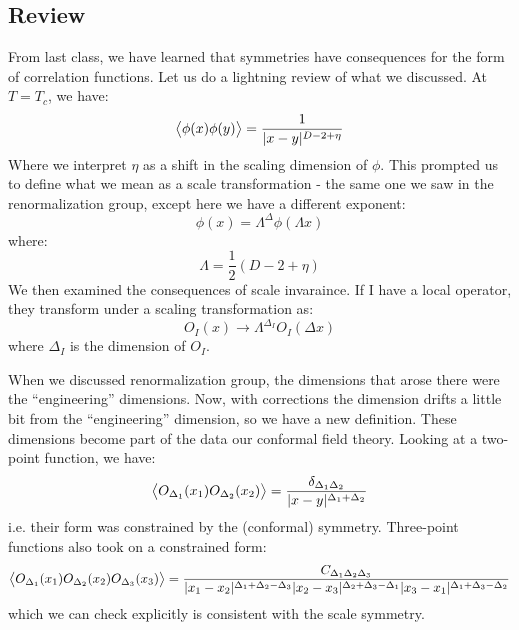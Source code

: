 \section{}
\subsection{Review}
From last class, we have learned that symmetries have consequences for the form of correlation functions. Let us do a lightning review of what we discussed. At $T = T_c$, we have:
\begin{equation}
    \avg{\phi(x)\phi(y)} = \frac{1}{\abs{x-y}^{D-2+\eta}}
\end{equation}
Where we interpret $\eta$ as a shift in the scaling dimension of $\phi$. This prompted us to define what we mean as a scale transformation - the same one we saw in the renormalization group, except here we have a different exponent:
\begin{equation}
    \phi(x) = \Lambda^\Delta\phi(\Lambda x)
\end{equation}
where:
\begin{equation}
    \Lambda = \frac{1}{2}(D - 2 + \eta)
\end{equation}
We then examined the consequences of scale invaraince. If I have a local operator, they transform under a scaling transformation as:
\begin{equation}
    O_I(x) \to \Lambda^{\Delta_I}O_I(\Delta x)
\end{equation}
where $\Delta_I$ is the dimension of $O_I$.

When we discussed renormalization group, the dimensions that arose there were the ``engineering'' dimensions. Now, with corrections the dimension drifts a little bit from the ``engineering'' dimension, so we have a new definition. These dimensions become part of the data our conformal field theory. Looking at a two-point function, we have:
\begin{equation}
    \left< O_{\Delta_1}(x_1)O_{\Delta_2}(x_2) \right> = \frac{\delta_{\Delta_1\Delta_2}}{\lvert x-y \rvert^{\Delta_1 + \Delta_2}}
\end{equation}
i.e. their form was constrained by the (conformal) symmetry. Three-point functions also took on a constrained form:
\begin{equation}
    \left< O_{\Delta_1}(x_1)O_{\Delta_2}(x_2)O_{\Delta_3}(x_3) \right> = \frac{C_{\Delta_1\Delta_2\Delta_3}}{\lvert x_1 - x_2 \rvert^{\Delta_1 + \Delta_2 - \Delta_3}\lvert x_2-x_3 \rvert^{\Delta_2 + \Delta_3 - \Delta_1}\lvert x_3 - x_1 \rvert^{\Delta_1 + \Delta_3 - \Delta_2}}
\end{equation}
which we can check explicitly is consistent with the scale symmetry.

